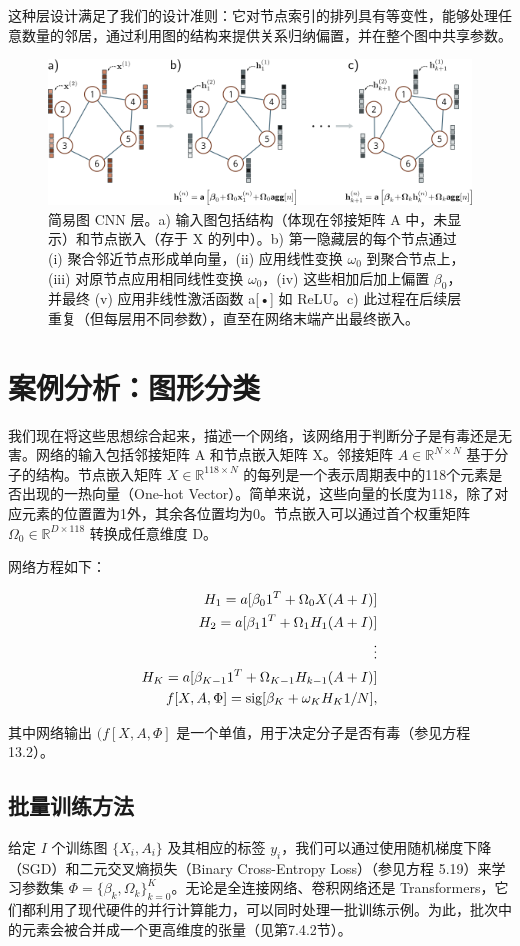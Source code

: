 这种层设计满足了我们的设计准则：它对节点索引的排列具有等变性，能够处理任意数量的邻居，通过利用图的结构来提供关系归纳偏置，并在整个图中共享参数。

\begin{figure}[ht!]
\centering
\includegraphics[width=0.7\linewidth]{png/chapter13/GraphGCN.png}
\caption{简易图 CNN 层。a) 输入图包括结构（体现在邻接矩阵 A 中，未显示）和节点嵌入（存于 X 的列中）。b) 第一隐藏层的每个节点通过 (i) 聚合邻近节点形成单向量，(ii) 应用线性变换 \(\omega_0\) 到聚合节点上，(iii) 对原节点应用相同线性变换 \(\omega_0\)，(iv) 这些相加后加上偏置 \(\beta_0\)，并最终 (v) 应用非线性激活函数 a[•] 如 ReLU。c) 此过程在后续层重复（但每层用不同参数），直至在网络末端产出最终嵌入。}
\end{figure}


\section{案例分析：图形分类}
我们现在将这些思想综合起来，描述一个网络，该网络用于判断分子是有毒还是无害。网络的输入包括邻接矩阵 A 和节点嵌入矩阵 X。邻接矩阵 \(A \in \mathbb{R}^{N \times N}\) 基于分子的结构。节点嵌入矩阵 \(X \in \mathbb{R}^{118 \times N}\) 的每列是一个表示周期表中的118个元素是否出现的一热向量（One-hot Vector）。简单来说，这些向量的长度为118，除了对应元素的位置置为1外，其余各位置均为0。节点嵌入可以通过首个权重矩阵  \(\Omega_0 \in \mathbb{R}^{D \times 118}\) 转换成任意维度 D。

网络方程如下：


\begin{align}
H_1 = a[\beta_0 1^T + \Omega_0 X(A + I)] \notag \\
H_2 = a[\beta_1 1^T + \Omega_1 H_1(A + I)] \notag \\
\vdots \notag \\
H_K = a[\beta_{K-1} 1^T + \Omega_{K-1} H_{k-1}(A + I)] \notag \\
f[X, A, \Phi] = \text{sig}[\beta_K + \omega_K H_K 1/N], 
\end{align} 


其中网络输出 \((f[X, A, \Phi]\) 是一个单值，用于决定分子是否有毒（参见方程 13.2）。
\subsection{批量训练方法}
给定 \(I\) 个训练图 \(\{X_i, A_i\}\) 及其相应的标签 \(y_i\)，我们可以通过使用随机梯度下降（SGD）和二元交叉熵损失（Binary Cross-Entropy Loss）（参见方程 5.19）来学习参数集 \(\Phi = \{\beta_k, \Omega_k\}^K_{k=0}\)。无论是全连接网络、卷积网络还是 Transformers，它们都利用了现代硬件的并行计算能力，可以同时处理一批训练示例。为此，批次中的元素会被合并成一个更高维度的张量（见第7.4.2节）。

